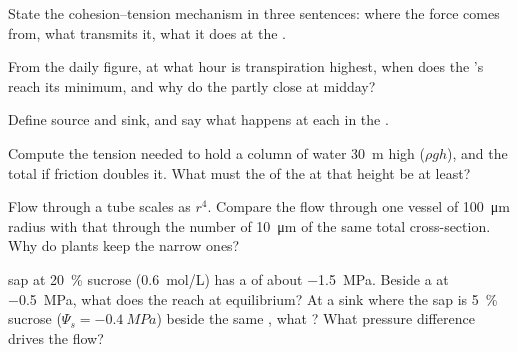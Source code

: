\begin{exercise}[$\star$]\label{exo:b1:plant-transport:2}
State the cohesion--tension mechanism in three sentences: where the
force comes from, what transmits it, what it does at the .
\end{exercise}

\begin{exercise}[$\star$]\label{exo:b1:plant-transport:3}
From the daily figure, at what hour is transpiration highest, when
does the 's  reach its minimum, and why do the
 partly close at midday?
\end{exercise}

\begin{exercise}[$\star$]\label{exo:b1:plant-transport:4}
Define source and sink, and say what happens at each in the
.
\end{exercise}

\begin{exercise}[$\star\star$]\label{exo:b1:plant-transport:5}
Compute the tension needed to hold a column of water \qty{30}{m} high
($\rho g h$), and the total if friction doubles it. What must the  of the  at that height be at least?
\end{exercise}

\begin{exercise}[$\star\star$]\label{exo:b1:plant-transport:6}
Flow through a tube scales as $r^4$. Compare the flow through one
vessel of \qty{100}{\micro m} radius with that through the number of
\qty{10}{\micro m}  of the same total cross-section. Why do
plants keep the narrow ones?
\end{exercise}

\begin{exercise}[$\star\star$]\label{exo:b1:plant-transport:7}
 sap at \qty{20}{\%} sucrose (\qty{0.6}{mol/L}) has a  of about \qty{-1.5}{MPa}. Beside a  at \qty{-0.5}{MPa},
what  does the  reach at equilibrium? At a sink where
the sap is \qty{5}{\%} sucrose ($\Psi_s = \qty{-0.4}{MPa}$) beside the
same , what ? What pressure difference drives the flow?
\end{exercise}

